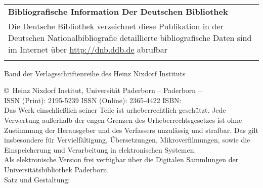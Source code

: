 \begin{titlepage}	
	\sffamily
	\fontsize{19bp}{0.25bp}\selectfont \textbf{\textit{\meinVorName~\meinNachName}}\\\\
	\vspace*{20bp}\\
	\fontsize{25bp}{0.25bp}\selectfont \textbf{\textit{\meinTitel}}\\\\
	\vspace*{25 bp}\\
	\textbf{\textit{\meinTitelEnglish}}
		
	\newpage
	\pagestyle{empty} %
	\fontsize{11bp}{2.5bp}\selectfont
	\begin{tabular}{|p{14cm}|}
		\hline
		\vspace*{1 mm}
		\textbf{Bibliografische Information Der Deutschen Bibliothek}\\	
		Die Deutsche Bibliothek verzeichnet diese Publikation in der Deutschen Nationalbibliografie detaillierte bibliografische Daten sind im Internet über  \url{http://dnb.ddb.de} abrufbar\\
		\vspace*{1 mm}\\
		\hline
	\end{tabular}
	
	\vfill
	 Band \Band der Verlagsschriftenreihe des Heinz Nixdorf Instituts\\[10\baselineskip]
	 \newline
	
	\copyright~Heinz Nixdorf Institut, Universität Paderborn -- Paderborn -- \meinErstellungsdatum\\[4\baselineskip]

	ISSN (Print): 2195-5239\newline
	ISSN (Online): 2365-4422\newline
	ISBN: \ISBN\\[4\baselineskip]
	
	Das Werk einschließlich seiner Teile ist urheberrechtlich geschützt. Jede Verwertung außerhalb der engen Grenzen des Urheberrechtsgesetzes ist ohne Zustimmung der Herausgeber und des Verfassers unzulässig und strafbar. Das gilt insbesondere für Vervielfältigung, Übersetzungen, Mikroverfilmungen, sowie die Einspeicherung und Verarbeitung in elektronischen Systemen.\\[4\baselineskip]
		
	Als elektronische Version frei verfügbar über die Digitalen Sammlungen der Universitätsbibliothek Paderborn.\\[20\baselineskip]	
	Satz und Gestaltung: \meinVorName \meinNachName\\[10\baselineskip]	




\end{titlepage}
